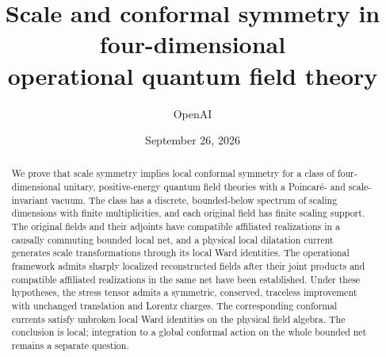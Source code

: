 \documentclass[11pt]{article}
\title{Scale and conformal symmetry in four-dimensional\\operational quantum field theory}
\author{OpenAI}
\date{September 26, 2026}
\numberwithin{equation}{section}
\theoremstyle{definition}
\theoremstyle{remark}
\begin{document}
\maketitle
\begin{abstract}
We prove that scale symmetry implies local conformal symmetry for a class
of four-dimensional unitary, positive-energy quantum field theories with a
Poincar\'e- and scale-invariant vacuum. The class has a discrete,
bounded-below spectrum of scaling dimensions with finite multiplicities,
and each original field has finite scaling support. The original fields
and their adjoints have compatible affiliated realizations in a causally
commuting bounded local net, and a physical local dilatation current
generates scale transformations through its local Ward identities. The
operational framework admits sharply localized reconstructed fields after
their joint products and compatible affiliated realizations in the same
net have been established. Under these hypotheses, the stress tensor admits
a symmetric, conserved, traceless improvement with unchanged translation
and Lorentz charges. The corresponding conformal currents satisfy unbroken
local Ward identities on the physical field algebra. The conclusion is
local; integration to a global conformal action on the whole bounded net
remains a separate question.
\end{abstract}
\tableofcontents










\end{document}
